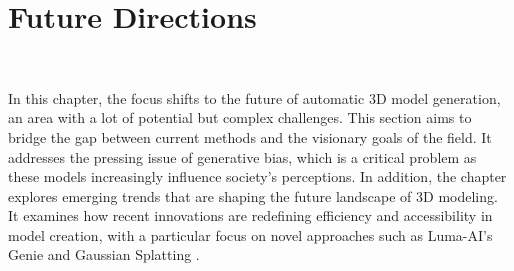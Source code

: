 \chapter{Future Directions}~\label{ch:future}

In this chapter, the focus shifts to the future of automatic 3D model generation, an area with a lot of potential but complex challenges. This section aims to bridge the gap between current methods and the visionary goals of the field. It addresses the pressing issue of generative bias, which is a critical problem as these models increasingly influence society's perceptions. In addition, the chapter explores emerging trends that are shaping the future landscape of 3D modeling. It examines how recent innovations are redefining efficiency and accessibility in model creation, with a particular focus on novel approaches such as Luma-AI's Genie \citep{LumaAIGenie2023} and Gaussian Splatting \citep{kerbl3Dgaussians}.



